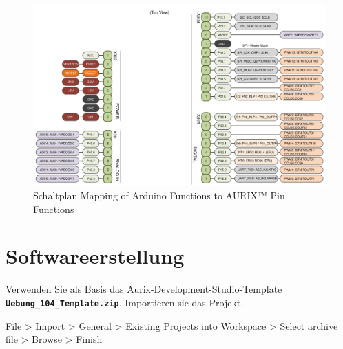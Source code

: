 \documentclass[
    fontsize=12pt,                      %
    paper=a4,                           %
    twoside=off,                       %
    DIV=15,                             %
    BCOR=12mm,                          %
    headings=normal,                    %
    headsepline=false,                   %
    footsepline=false,                  %
    headinclude=true,                   %
    footinclude=false,                  %
    toc=listof,                         %
    toc=bib,                            %
    chapterprefix=false,                %
    appendixprefix=false,               %
    numbers=noendperiod,                %
    captions=tableabove,                %
    footnotes=multiple,                 %
    bibliography=oldstyle,              %
    draft=false,                        %
]{scrreprt}
\newcommand{\Farbcode}[1]{\texttt{\textbf{\textcolor{myred}{#1}}}}
\begin{document}
\begin{figure}[H]
  \centering
  \includegraphics[width=0.90\linewidth]{Figures/Uebung_104_Arduino_Pins.png}
  \caption{Schaltplan Mapping of Arduino Functions to AURIX™ Pin Functions}
\end{figure}
 
\section*{Softwareerstellung} 

Verwenden Sie als Basis das Aurix-Development-Studio-Template \Farbcode{Uebung\_104\_Template.zip}. Importieren sie das Projekt. 

File > Import > General > Existing Projects into Workspace > Select archive file > Browse > Finish
\end{document}
